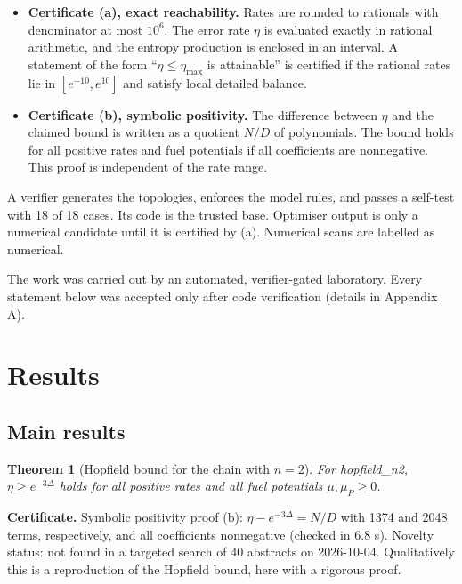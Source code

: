 \documentclass[11pt]{article}
\providecommand{\tightlist}{\setlength{\itemsep}{0pt}\setlength{\parskip}{0pt}}
\newtheorem{theorem}{Theorem}\newtheorem{proposition}[theorem]{Proposition}\newtheorem{lemma}[theorem]{Lemma}\newtheorem{corollary}[theorem]{Corollary}
\theoremstyle{definition}\newtheorem{definition}[theorem]{Definition}\newtheorem{example}[theorem]{Example}
\begin{document}
\begin{itemize}
\tightlist
\item
  \textbf{Certificate (a), exact reachability.} Rates are rounded to rationals with denominator at most \(10^{6}\). The error rate \(\eta\) is evaluated exactly in rational arithmetic, and the entropy production is enclosed in an interval. A statement of the form ``\(\eta\le\eta_{\max}\) is attainable'' is certified if the rational rates lie in \([e^{-10},e^{10}]\) and satisfy local detailed balance.
\item
  \textbf{Certificate (b), symbolic positivity.} The difference between \(\eta\) and the claimed bound is written as a quotient \(N/D\) of polynomials. The bound holds for all positive rates and fuel potentials if all coefficients are nonnegative. This proof is independent of the rate range.
\end{itemize}

A verifier generates the topologies, enforces the model rules, and passes a self-test with 18 of 18 cases. Its code is the trusted base. Optimiser output is only a numerical candidate until it is certified by (a). Numerical scans are labelled as numerical.

The work was carried out by an automated, verifier-gated laboratory. Every statement below was accepted only after code verification (details in Appendix A).

\section{Results}\label{results}

\subsection{Main results}\label{main-results}

\begin{theorem}[Hopfield bound for the chain with $n=2$]
For hopfield\_n2, \(\eta\ge e^{-3\Delta}\) holds for all positive rates and all fuel potentials \(\mu,\mu_P\ge0\).
\end{theorem}

\textbf{Certificate.} Symbolic positivity proof (b): \(\eta-e^{-3\Delta}=N/D\) with 1374 and 2048 terms, respectively, and all coefficients nonnegative (checked in 6.8 s). Novelty status: not found in a targeted search of 40 abstracts on 2026-10-04. Qualitatively this is a reproduction of the Hopfield bound, here with a rigorous proof.
\end{document}
